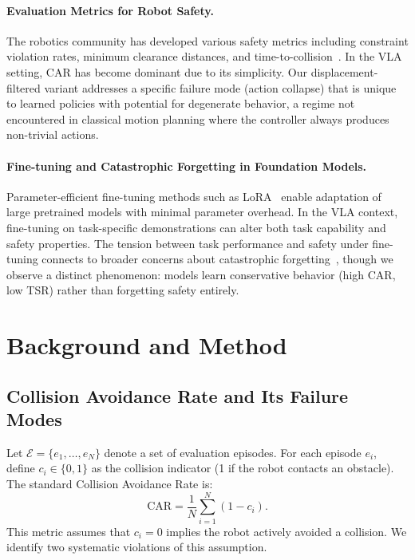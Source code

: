 \documentclass[10pt,letterpaper]{article}
\newcommand{\CAR}{\text{CAR}}
\begin{document}
\paragraph{Evaluation Metrics for Robot Safety.}
The robotics community has developed various safety metrics including constraint violation rates, minimum clearance distances, and time-to-collision~\cite{safety_metrics2023}. In the VLA setting, CAR has become dominant due to its simplicity. Our displacement-filtered variant addresses a specific failure mode (action collapse) that is unique to learned policies with potential for degenerate behavior, a regime not encountered in classical motion planning where the controller always produces non-trivial actions.

\paragraph{Fine-tuning and Catastrophic Forgetting in Foundation Models.}
Parameter-efficient fine-tuning methods such as LoRA~\cite{hu2022lora} enable adaptation of large pretrained models with minimal parameter overhead. In the VLA context, fine-tuning on task-specific demonstrations can alter both task capability and safety properties. The tension between task performance and safety under fine-tuning connects to broader concerns about catastrophic forgetting~\cite{kirkpatrick2017ewc}, though we observe a distinct phenomenon: models learn conservative behavior (high CAR, low TSR) rather than forgetting safety entirely.

\section{Background and Method}
\label{sec:method}

\subsection{Collision Avoidance Rate and Its Failure Modes}
\label{sec:car_failure}

Let $\mathcal{E} = \{e_1, \ldots, e_N\}$ denote a set of evaluation episodes. For each episode $e_i$, define $c_i \in \{0, 1\}$ as the collision indicator (1 if the robot contacts an obstacle). The standard Collision Avoidance Rate is:
\begin{equation}
    \CAR = \frac{1}{N} \sum_{i=1}^{N} (1 - c_i).
\end{equation}
This metric assumes that $c_i = 0$ implies the robot actively avoided a collision. We identify two systematic violations of this assumption.
\end{document}
